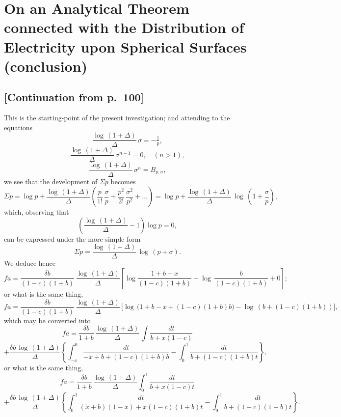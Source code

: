 \documentclass[11pt,a4paper]{book}
\begin{document}
\newpage

\setcounter{page}{101}


\section*{On an Analytical Theorem connected with the Distribution of Electricity upon Spherical Surfaces (conclusion)}
\label{paper:245}

\subsection*{[Continuation from p.~100]}

This is the starting-point of the present investigation; and attending to the equations
\[
\frac{\log\,(1+\Delta)}{\Delta}\,\sigma = -\tfrac{1}{p},
\]
\[
\frac{\log\,(1+\Delta)}{\Delta}\,\sigma^{n-1} = 0,\quad (n>1),
\]
\[
\frac{\log\,(1+\Delta)}{\Delta}\,\sigma^n = B_{p,n},
\]
we see that the development of $\Sigma p$ becomes
\[
\Sigma p = \log p + \frac{\log\,(1+\Delta)}{\Delta}\left(\frac{p}{1!}\,\frac{\sigma}{p} + \frac{p^2}{2!}\,\frac{\sigma^2}{p^2} + \ldots\right) = \log p + \frac{\log\,(1+\Delta)}{\Delta}\,\log\,\left(1+\frac{\sigma}{p}\right),
\]
which, observing that
\[
\left(\frac{\log\,(1+\Delta)}{\Delta} - 1\right)\log p = 0,
\]
can be expressed under the more simple form
\[
\Sigma p = \frac{\log\,(1+\Delta)}{\Delta}\,\log\,(p+\sigma).
\]
We deduce hence
\[
fa = \frac{\delta b}{(1-c)(1+b)}\,\frac{\log\,(1+\Delta)}{\Delta}\left[\log\frac{1+b-x}{(1-c)(1+b)} + \log\,\frac{b}{(1-c)(1+b)} + 0\right];
\]
or what is the same thing,
\[
fa = \frac{\delta b}{(1-c)(1+b)}\,\frac{\log\,(1+\Delta)}{\Delta}\,\big[\log\,(1+b-x+(1-c)(1+b)b\big) - \log\,(b+(1-c)(1+b))\big],
\]
which may be converted into
\[
fa = \frac{\delta b}{1+b}\,\frac{\log\,(1+\Delta)}{\Delta}\,\int\frac{dt}{b+x(1-c)}
\]
\[
+\frac{\delta b\,\log\,(1+\Delta)}{\Delta}\left\{\int_{-x}^{0}\frac{dt}{-x+b+(1-c)(1+b)b}-\int_{0}^{1}\frac{dt}{b+(1-c)(1+b)t}\right\},
\]
or what is the same thing,
\[
fa = \frac{\delta b}{1+b}\,\frac{\log\,(1+\Delta)}{\Delta}\int_{0}^{1}\frac{dt}{b+x(1-c)t}
\]
\[
+\frac{\delta b\,\log\,(1+\Delta)}{\Delta}\left\{\int_{0}^{1}\frac{dt}{(\dot{x}+b)(1-x)+x(1-c)(1+b)t}-\int_{0}^{1}\frac{dt}{b+(1-c)(1+b)t}\right\}.
\]
\end{document}
